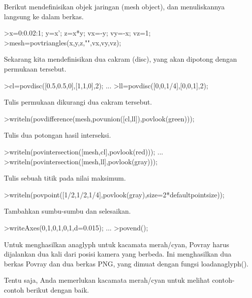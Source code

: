 \documentclass[a4paper,10pt]{article}
\begin{document}
\begin{eulernotebook}
\begin{eulercomment}
\begin{eulercomment}
\begin{eulercomment}
Berikut mendefinisikan objek jaringan (mesh object), dan menuliskannya
langsung ke dalam berkas.
\end{eulercomment}
\begin{eulerprompt}
>x=0:0.02:1; y=x'; z=x*y; vx=-y; vy=-x; vz=1;
>mesh=povtriangles(x,y,z,"",vx,vy,vz);
\end{eulerprompt}
\begin{eulercomment}
Sekarang kita mendefinisikan dua cakram (disc), yang akan dipotong
dengan permukaan tersebut.
\end{eulercomment}
\begin{eulerprompt}
>cl=povdisc([0.5,0.5,0],[1,1,0],2); ...
>ll=povdisc([0,0,1/4],[0,0,1],2);
\end{eulerprompt}
\begin{eulercomment}
Tulis permukaan dikurangi dua cakram tersebut.
\end{eulercomment}
\begin{eulerprompt}
>writeln(povdifference(mesh,povunion([cl,ll]),povlook(green)));
\end{eulerprompt}
\begin{eulercomment}
Tulis dua potongan hasil interseksi.
\end{eulercomment}
\begin{eulerprompt}
>writeln(povintersection([mesh,cl],povlook(red))); ...
>writeln(povintersection([mesh,ll],povlook(gray)));
\end{eulerprompt}
\begin{eulercomment}
Tulis sebuah titik pada nilai maksimum.
\end{eulercomment}
\begin{eulerprompt}
>writeln(povpoint([1/2,1/2,1/4],povlook(gray),size=2*defaultpointsize));
\end{eulerprompt}
\begin{eulercomment}
Tambahkan sumbu-sumbu dan selesaikan.
\end{eulercomment}
\begin{eulerprompt}
>writeAxes(0,1,0,1,0,1,d=0.015); ...
>povend();
\end{eulerprompt}
\begin{eulercomment}
Untuk menghasilkan anaglyph untuk kacamata merah/cyan, Povray harus
dijalankan dua kali dari posisi kamera yang berbeda. Ini menghasilkan
dua berkas Povray dan dua berkas PNG, yang dimuat dengan fungsi
loadanaglyph().

Tentu saja, Anda memerlukan kacamata merah/cyan untuk melihat
contoh-contoh berikut dengan baik.


\end{eulercomment}
\end{eulercomment}
\end{eulercomment}
\end{eulernotebook}
\end{document}
